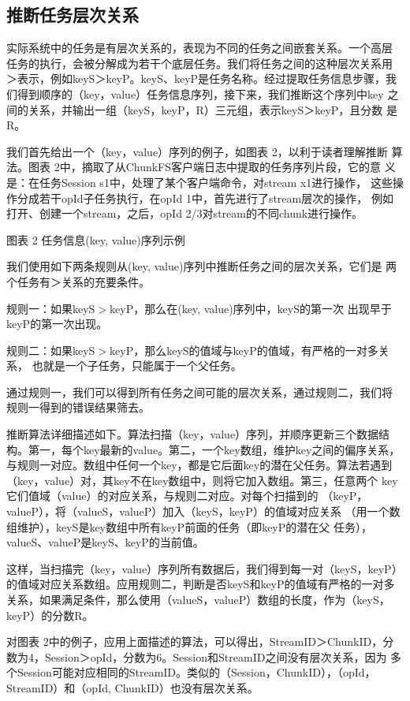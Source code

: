 \subsection{推断任务层次关系}

实际系统中的任务是有层次关系的，表现为不同的任务之间嵌套关系。一个高层
任务的执行，会被分解成为若干个底层任务。我们将任务之间的这种层次关系用
＞表示，例如keyS＞keyP。keyS、keyP是任务名称。经过提取任务信息步骤，我
们得到顺序的（key，value）任务信息序列，接下来，我们推断这个序列中key
之间的关系，并输出一组（keyS，keyP，R）三元组，表示keyS＞keyP，且分数
是R。

我们首先给出一个（key，value）序列的例子，如图表 2，以利于读者理解推断
算法。图表 2中，摘取了从ChunkFS客户端日志中提取的任务序列片段，它的意
义是：在任务Session s1中，处理了某个客户端命令，对stream x1进行操作，
这些操作分成若干opId子任务执行，在opId 1中，首先进行了stream层次的操作，
例如打开、创建一个stream，之后，opId 2/3对stream的不同chunk进行操作。
 
图表 2 任务信息(key, value)序列示例

我们使用如下两条规则从(key, value)序列中推断任务之间的层次关系，它们是
两个任务有＞关系的充要条件。

规则一：如果keyS$>$keyP，那么在(key, value)序列中，keyS的第一次
出现早于keyP的第一次出现。

规则二：如果keyS$>$keyP，那么keyS的值域与keyP的值域，有严格的一对多关系，
也就是一个子任务，只能属于一个父任务。

通过规则一，我们可以得到所有任务之间可能的层次关系，通过规则二，我们将
规则一得到的错误结果筛去。

推断算法详细描述如下。算法扫描（key，value）序列，并顺序更新三个数据结
构。第一，每个key最新的value。第二，一个key数组，维护key之间的偏序关系，
与规则一对应。数组中任何一个key，都是它后面key的潜在父任务。算法若遇到
（key，value）对，其key不在key数组中，则将它加入数组。第三，任意两个
key它们值域（value）的对应关系，与规则二对应。对每个扫描到的
（keyP，valueP），将（valueS，valueP）加入（keyS，keyP）的值域对应关系
（用一个数组维护），keyS是key数组中所有keyP前面的任务（即keyP的潜在父
任务），valueS、valueP是keyS、keyP的当前值。

这样，当扫描完（key，value）序列所有数据后，我们得到每一对（keyS，keyP）
的值域对应关系数组。应用规则二，判断是否keyS和keyP的值域有严格的一对多
关系，如果满足条件，那么使用（valueS，valueP）数组的长度，作为（keyS，
keyP）的分数R。

对图表 2中的例子，应用上面描述的算法，可以得出，StreamID＞ChunkID，分
数为4，Session＞opId，分数为6。Session和StreamID之间没有层次关系，因为
多个Session可能对应相同的StreamID。类似的（Session，ChunkID），（opId，
StreamID）和（opId, ChunkID）也没有层次关系。

